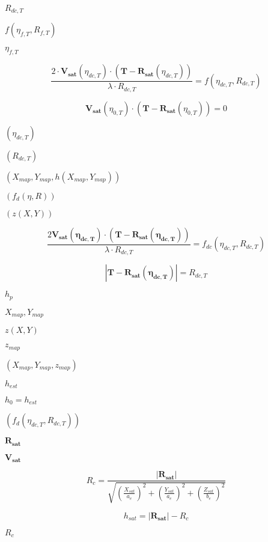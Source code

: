 \documentclass{article}
\begin{document}
$R_{dc,T}$
\pagebreak

$f\left(\eta_{f,T},R_{f,T}\right)$
\pagebreak

$ \eta_{f,T}$
\pagebreak

\[ \frac{2 \cdot \mathbf{V_{sat}}\left( \eta_{dc,T} \right) \cdot \left( \mathbf{T} - \mathbf{R_{sat}}\left(\eta_{dc,T}\right) \right)}{\lambda \cdot R_{dc,T}} = f\left(\eta_{dc,T}, R_{dc,T}\right) \]
\pagebreak

\[ \mathbf{V_{sat}}\left( \eta_{0,T} \right) \cdot \left( \mathbf{T} - \mathbf{R_{sat}}\left(\eta_{0,T}\right) \right) = 0 \]
\pagebreak

$ \left( \eta_{dc,T} \right) $
\pagebreak

$\left( R_{dc,T}\right) $
\pagebreak

$\left(X_{map}, Y_{map}, h\left(X_{map}, Y_{map}\right)\right)$
\pagebreak

$\left( f_d\left(\eta,R\right)\right)$
\pagebreak

$ \left(z\left( X, Y\right)\right)$
\pagebreak

\[ \frac{2 \mathbf{V_{sat}\left(\eta_{dc,T}\right)} \cdot \left( \mathbf{T} - \mathbf{R_{sat}\left(\eta_{dc,T}\right)} \right)}{\lambda \cdot R_{dc,T}} = f_{dc}\left(\eta_{dc,T}, R_{dc,T} \right) \]
\pagebreak

\[ \left| \mathbf{T} - \mathbf{R_{sat}\left(\eta_{dc,T}\right)} \right | = R_{dc,T} \]
\pagebreak

$h_p$
\pagebreak

$X_{map}, Y_{map}$
\pagebreak

$ z\left(X,Y\right) $
\pagebreak

$z_{map}$
\pagebreak

$\left(X_{map}, Y_{map}, z_{map}\right)$
\pagebreak

$h_{est}$
\pagebreak

$h_0 = h_{est}$
\pagebreak

$ \left( f_{d}\left(\eta_{dc,T}, R_{dc,T}\right) \right) $
\pagebreak

$\mathbf{R_{sat}}$
\pagebreak

$\mathbf{V_{sat}}$
\pagebreak

\[ R_c =\frac{\left| \mathbf{R_{sat}}\right|} {\sqrt{ \left( \frac{X_{sat}}{a_e} \right)^2 + \left( \frac{Y_{sat}}{a_e} \right)^2 + \left( \frac{Z_{sat}}{b_e} \right)^2 }} \]
\pagebreak

\[ h_{sat} = \left| \mathbf{R_{sat}} \right| - R_c \]
\pagebreak

$R_c$
\pagebreak
\end{document}
